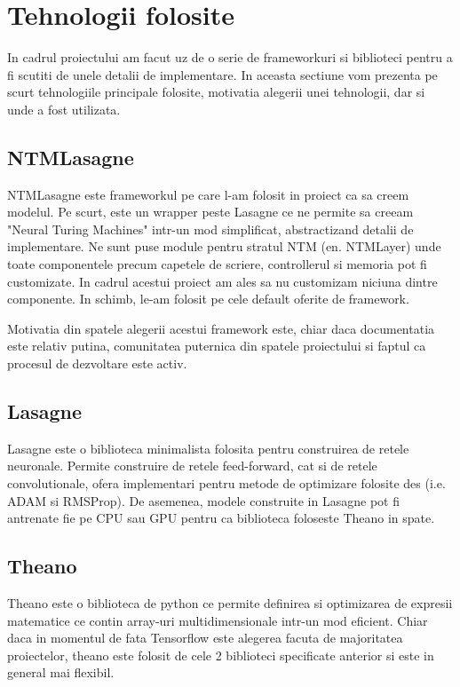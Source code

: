 \documentclass[12pt]{article}
\begin{document}
\section{Tehnologii folosite}

In cadrul proiectului am facut uz de o serie de frameworkuri si biblioteci pentru a fi scutiti de unele detalii de implementare. In aceasta sectiune vom prezenta pe scurt tehnologiile principale folosite, motivatia alegerii unei tehnologii, dar si unde a fost utilizata.

\subsection{NTMLasagne}

NTMLasagne este frameworkul pe care l-am folosit in proiect ca sa creem modelul. Pe scurt, este un wrapper peste Lasagne  ce ne permite sa creeam "Neural Turing Machines" intr-un mod simplificat, abstractizand detalii de implementare. Ne sunt puse module pentru stratul NTM (en. NTMLayer) unde toate componentele precum capetele de scriere, controllerul si memoria pot fi customizate. In cadrul acestui proiect am ales sa nu customizam niciuna dintre componente. In schimb, le-am folosit pe cele default oferite de framework.

Motivatia din spatele alegerii acestui framework este, chiar daca documentatia este relativ putina, comunitatea puternica din spatele proiectului si faptul ca procesul de dezvoltare este activ.


\subsection{Lasagne}

Lasagne este o biblioteca minimalista folosita pentru construirea de retele neuronale. Permite construire de retele feed-forward, cat si de retele convolutionale, ofera implementari pentru metode de optimizare folosite des (i.e. ADAM si RMSProp). De asemenea, modele construite in Lasagne pot fi antrenate fie pe CPU sau GPU pentru ca biblioteca foloseste Theano in spate.


\subsection{Theano}

Theano este o biblioteca de python ce permite definirea si optimizarea de expresii matematice ce contin array-uri multidimensionale intr-un mod eficient. Chiar daca in momentul de fata Tensorflow este alegerea facuta de majoritatea proiectelor, theano este folosit de cele 2 biblioteci specificate anterior si este in general mai flexibil.
\end{document}
